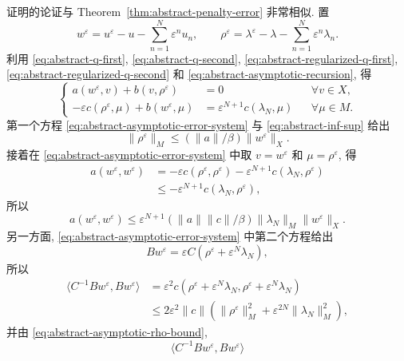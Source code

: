 
\begin{Proof}
证明的论证与 Theorem~\ref{thm:abstract-penalty-error} 非常相似. 置
\[
w^\varepsilon=u^\varepsilon-u-\sum_{n=1}^N\varepsilon^nu_n,
\qquad
\rho^\varepsilon=\lambda^\varepsilon-\lambda-
\sum_{n=1}^N\varepsilon^n\lambda_n.
\]
利用 
\eqref{eq:abstract-q-first},
\eqref{eq:abstract-q-second},
\eqref{eq:abstract-regularized-q-first},
\eqref{eq:abstract-regularized-q-second} 和
\eqref{eq:abstract-asymptotic-recursion}, 得
\begin{equation}\label{eq:abstract-asymptotic-error-system}
\left\{
\begin{aligned}
a(w^\varepsilon,v)+b(v,\rho^\varepsilon)&=0
&&\forall v\in X,\\
-\varepsilon c(\rho^\varepsilon,\mu)+b(w^\varepsilon,\mu)
&=\varepsilon^{N+1}c(\lambda_N,\mu)
&&\forall\mu\in M.
\end{aligned}
\right.
\end{equation}
第一个方程 
\eqref{eq:abstract-asymptotic-error-system} 与
\eqref{eq:abstract-inf-sup} 给出
\begin{equation}\label{eq:abstract-asymptotic-rho-bound}
\|\rho^\varepsilon\|_M
\le(\|a\|/\beta)\|w^\varepsilon\|_X.
\end{equation}
接着在 
\eqref{eq:abstract-asymptotic-error-system} 中取
$v=w^\varepsilon$ 和 $\mu=\rho^\varepsilon$, 得
\[
\begin{aligned}
a(w^\varepsilon,w^\varepsilon)
&=-\varepsilon c(\rho^\varepsilon,\rho^\varepsilon)
-\varepsilon^{N+1}c(\lambda_N,\rho^\varepsilon)\\
&\le-\varepsilon^{N+1}c(\lambda_N,\rho^\varepsilon),
\end{aligned}
\]
所以
\[
a(w^\varepsilon,w^\varepsilon)
\le\varepsilon^{N+1}(\|a\|\|c\|/\beta)
\|\lambda_N\|_M\|w^\varepsilon\|_X.
\]
另一方面, 
\eqref{eq:abstract-asymptotic-error-system} 中第二个方程给出
\[
Bw^\varepsilon=\varepsilon C(\rho^\varepsilon+\varepsilon^N\lambda_N),
\]
所以
\[
\begin{aligned}
\langle C^{-1}Bw^\varepsilon,Bw^\varepsilon\rangle
&=\varepsilon^2c(\rho^\varepsilon+\varepsilon^N\lambda_N,
\rho^\varepsilon+\varepsilon^N\lambda_N)\\
&\le2\varepsilon^2\|c\|
(\|\rho^\varepsilon\|_M^2+\varepsilon^{2N}\|\lambda_N\|_M^2),
\end{aligned}
\]
并由 
\eqref{eq:abstract-asymptotic-rho-bound},
\[
\langle C^{-1}Bw^\varepsilon,Bw^\varepsilon\rangle
\]
\end{Proof}
